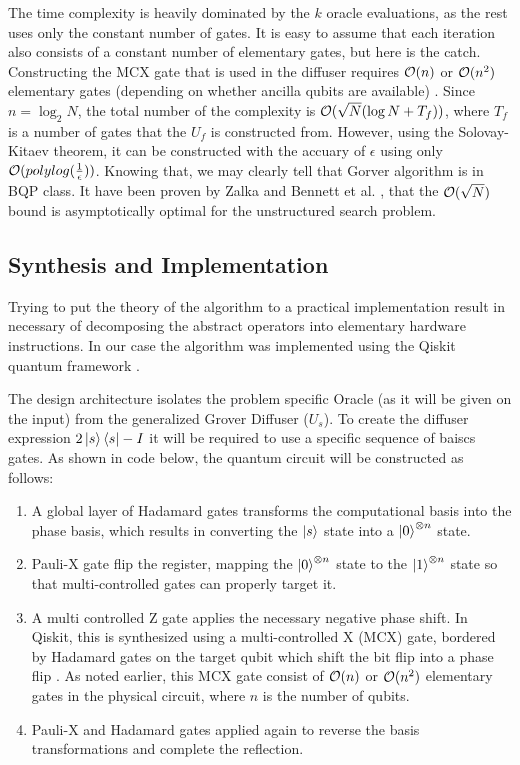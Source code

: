 \bigskip
The time complexity is heavily dominated by the $k$ oracle evaluations, as the rest uses only the constant number of gates. 
It is easy to assume that each iteration also consists of a constant number of elementary gates, but here is the catch. 
%
%
Constructing the MCX gate that is used in the diffuser requires $\mathcal{O}(n)$ or $\mathcal{O}(n^2)$ elementary gates (depending on whether ancilla 
qubits are available) \cite{barenco1995elementary}. 
Since $n = \log_2 N$, the total number of the complexity is $\mathcal{O}(\sqrt{N} (\log N + T_f))$, where $T_f$ is a number of gates that the $U_f$ is constructed from. 
However, using the Solovay-Kitaev theorem, it can be constructed with the accuary of $\epsilon$ using only $\mathcal{O}(polylog(\frac{1}{\epsilon}))$. 
Knowing that, we may clearly tell that Gorver algorithm is in BQP class. 
It have been proven by Zalka and Bennett et al. \cite{zalka1999grover, bennett1997strengths}, that the $\mathcal{O}(\sqrt{N})$ 
bound is asymptotically optimal for the unstructured search problem. 
%
%
%
%

\subsection{Synthesis and Implementation}

Trying to put the theory of the algorithm to a practical implementation result in necessary of decomposing the abstract 
operators into elementary hardware instructions. 
In our case the algorithm was implemented using the Qiskit quantum framework \cite{qiskit2023}.

\bigskip
The design architecture isolates the problem specific Oracle (as it will be given on the input) 
from the generalized Grover Diffuser ($U_s$). 
To create the diffuser expression $2\ket{s}\bra{s} - I$ it will be required to use a specific sequence of baiscs gates. 
As shown in code below, the quantum circuit will be constructed as follows:
\begin{enumerate}
    \item A global layer of Hadamard gates transforms the computational basis into the phase basis, which results in 
    converting the $\ket{s}$ state into a $\ket{0}^{\otimes n}$ state.

    \item Pauli-X gate flip the register, mapping the $\ket{0}^{\otimes n}$ state to the 
    $\ket{1}^{\otimes n}$ state so that multi-controlled gates can properly target it.

    \item A multi controlled Z gate applies the necessary negative phase shift. 
    In Qiskit, this is synthesized using a multi-controlled X (MCX) gate, 
    bordered by Hadamard gates on the target qubit which shift the bit flip into a phase flip \cite{barenco1995elementary}.
    As noted earlier, this MCX gate consist of $\mathcal{O}(n)$ or $\mathcal{O}(n^2)$ elementary gates in the physical circuit, where $n$ is the number of qubits.
    \item Pauli-X and Hadamard gates applied again to reverse the basis transformations and complete the reflection.
\end{enumerate}

